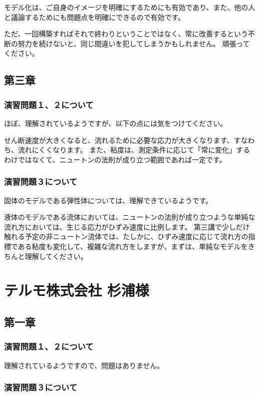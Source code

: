 \documentclass[uplatex,dvipdfmx,a4paper,11pt]{jsreport}
\begin{document}
モデル化は、ご自身のイメージを明確にするためにも有効であり、また、他の人と議論するためにも問題点を明確にできるので有効です。

ただ、一回構築すればそれで終わりということではなく、常に改善するという不断の努力を続けないと、同じ間違いを犯してしまうかもしれません。
頑張ってください。

\subsection*{第三章}
\subsubsection*{演習問題１、２について}
ほぼ、理解されているようですが、以下の点には気をつけてください。

せん断速度が大きくなると、流れるために必要な応力が大きくなります、すなわち、流れにくくなります。
また、粘度は、測定条件に応じて「常に変化」するわけではなくて、ニュートンの法則が成り立つ範囲であれば一定です。

\subsubsection*{演習問題３について}
固体のモデルである弾性体については、理解できているようです。

液体のモデルである流体においては、ニュートンの法則が成り立つような単純な流れ方においては、生じる応力がひずみ速度に比例します。
第三講で少しだけ触れる予定の非ニュートン流体では、たしかに、ひずみ速度に応じて流れ方の指標である粘度も変化して、複雑な流れ方をしますが、まずは、単純なモデルをきちんと理解してください。

\clearpage

\section*{テルモ株式会社 杉浦様}
\subsection*{第一章}
\subsubsection*{演習問題１、２について}
理解されているようですので、問題はありません。

\subsubsection*{演習問題３について}
\end{document}
